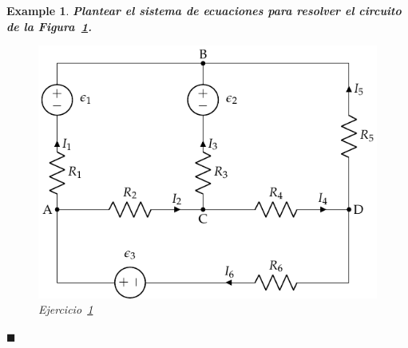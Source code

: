 \documentclass[11pt]{book} %
\numberwithin{dummy}{section}
\theoremstyle{ocrenumbox}
\theoremstyle{blacknumex}
\newtheorem{exampleT}{Example}[chapter]
\theoremstyle{blacknumbox}
\theoremstyle{ocrenum}
\newenvironment{example}{\begin{exampleT}}{\hfill{\tiny\ensuremath{\blacksquare}}\end{exampleT}}
\begin{document}
	\vspace{4mm}
	\begin{example}
		\label{ej.1-4}
		\textbf{Plantear el sistema de ecuaciones para resolver el circuito de la Figura~\ref{fig.mallas1}.}
		\begin{figure}[htbp]
			\centering
			\includegraphics[width=0.35\linewidth]{../figs/mallas1.pdf}
			\caption{Ejercicio~\ref{ej.1-4}}
			\label{fig.mallas1}
		\end{figure}
		

\end{example}
\end{document}
